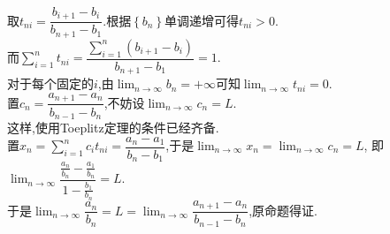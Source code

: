 \documentclass{ctexart}
\begin{document}
\begin{solution}[Proof.]
    取$t_{ni}=\dfrac{b_{i+1}-b_i}{b_{n+1}-b_1}$.根据$\left\{b_n\right\}$单调递增可得$t_{ni}>0$.\\
    而$\displaystyle\sum_{i=1}^{n}t_{ni}=\dfrac{\sum_{i=1}^{n}\left(b_{i+1}-b_{i}\right)}{b_{n+1}-b_1}=1$.\\
    对于每个固定的$i$,由$\displaystyle\lim_{n\to\infty}b_n=+\infty$可知$\displaystyle\lim_{n\to\infty}t_{ni}=0$.\\
    置$c_n=\dfrac{a_{n+1}-a_n}{b_{n-1}-b_{n}}$,不妨设$\displaystyle\lim_{n\to\infty}c_n=L$.\\
    这样,使用Toeplitz定理的条件已经齐备.\\
    置$\displaystyle x_n=\sum_{i=1}^{n}c_i{t_{ni}}=\dfrac{a_n-a_1}{b_n-b_1}$,于是$\displaystyle\lim_{n\to\infty}x_n=\lim_{n\to\infty}c_n=L$,
    即$\displaystyle\lim_{n\to\infty}\dfrac{\frac{a_n}{b_n}-\frac{a_1}{b_n}}{1-\frac{b_1}{b_n}}=L$.\\
    于是$\displaystyle\lim_{n\to\infty}\dfrac{a_n}{b_n}=L=\lim_{n\to\infty}\dfrac{a_{n+1}-a_n}{b_{n-1}-b_{n}}$,原命题得证.
\end{solution}
\end{document}
